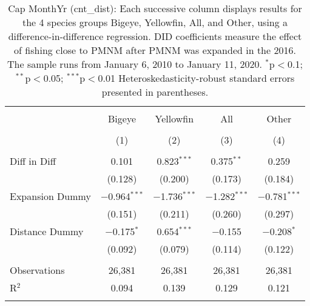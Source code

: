 
\begin{table}[!htbp] \centering 
  \caption{Cap MonthYr (cnt_dist): Each successive column displays results for the 4 species groups Bigeye, Yellowfin, All, and Other, using a difference-in-difference regression. DID coefficients measure the effect of fishing close to PMNM after PMNM was expanded in the 2016. The sample runs from January 6, 2010 to January 11, 2020. $^{*}$p$<$0.1; $^{**}$p$<$0.05; $^{***}$p$<$0.01 Heteroskedasticity-robust standard errors presented in parentheses.} 
  \label{tbl:timeFEcnt_dist} 
\begin{tabular}{@{\extracolsep{5pt}}lcccc} 
\\[-1.8ex]\hline 
\hline \\[-1.8ex] 
 & Bigeye & Yellowfin & All & Other \\ 
\\[-1.8ex] & (1) & (2) & (3) & (4)\\ 
\hline \\[-1.8ex] 
 Diff in Diff & 0.101 & 0.823$^{***}$ & 0.375$^{**}$ & 0.259 \\ 
  & (0.128) & (0.200) & (0.173) & (0.184) \\ 
  Expansion Dummy & $-$0.964$^{***}$ & $-$1.736$^{***}$ & $-$1.282$^{***}$ & $-$0.781$^{***}$ \\ 
  & (0.151) & (0.211) & (0.260) & (0.297) \\ 
  Distance Dummy & $-$0.175$^{*}$ & 0.654$^{***}$ & $-$0.155 & $-$0.208$^{*}$ \\ 
  & (0.092) & (0.079) & (0.114) & (0.122) \\ 
 \hline \\[-1.8ex] 
Observations & 26,381 & 26,381 & 26,381 & 26,381 \\ 
R$^{2}$ & 0.094 & 0.139 & 0.129 & 0.121 \\ 
\hline 
\hline \\[-1.8ex] 
\end{tabular} 
\end{table} 
